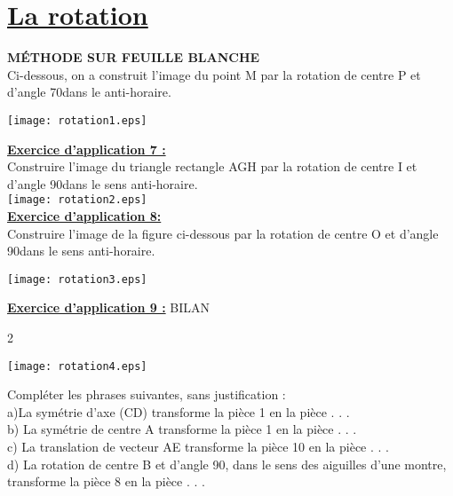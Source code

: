 \documentclass[a4paper,11pt]{article}
\newcommand{\textding}[1]{\text{\ding{#1}}}
\newcommand{\bmul}[1]{\begin{multicols}{#1}}
\newcommand{\emul}{\end{multicols}}
\begin{document}
\section{\underline{La rotation}}


 \textding{48} \textbf{MÉTHODE SUR FEUILLE BLANCHE}\\
 
Ci-dessous, on a construit l'image du point M par la rotation de centre P et d'angle 70\degre dans le anti-horaire.
\begin{flushleft}
\texttt{[image: rotation1.eps]} 
\end{flushleft}

\newpage

\textbf{\underline{Exercice d'application 7 :}}\\
Construire l'image du triangle rectangle AGH par la rotation de centre I et d'angle 90\degre dans le sens anti-horaire.\\
\texttt{[image: rotation2.eps]} \\

\textbf{\underline{Exercice d'application 8:}}\\
Construire l'image de la figure ci-dessous par la rotation de centre O et d'angle 90\degre dans le sens anti-horaire.\\
\begin{center}
\texttt{[image: rotation3.eps]} \\
\end{center}


\textbf{\underline{Exercice d'application 9 :}} BILAN\\
\bmul{2}
\begin{flushleft}
\texttt{[image: rotation4.eps]} 
\end{flushleft}

\columnbreak

Compléter les phrases suivantes, sans justification :\\

a)La symétrie d'axe (CD) transforme la pièce 1 en
la pièce . . .\\

b) La symétrie de centre A transforme la pièce 1 en
la pièce . . .\\

c) La translation de vecteur AE transforme la pièce
10 en la pièce . . .\\

d) La rotation de centre B et d'angle 90\degre, dans le
sens des aiguilles d'une montre, transforme la pièce
8 en la pièce . . .\\

\emul
\end{document}
